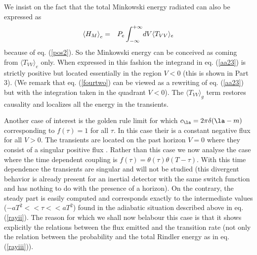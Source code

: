 \documentclass[12pt]{article}
\begin{document}
We insist on the fact that
the total Minkowski energy radiated can also be expressed as
\begin{eqnarray}
\mbox{$ \langle H_M \rangle $}_e &=& P_e \int^{+\infty}_{-\infty} \! dV\langle T_{VV} \rangle_e
\label{aa23}
\end{eqnarray}
because of eq. (\ref{pos2}).
So the Minkowski energy can be conceived as coming from
$\langle T_{VV} \rangle_e$ only. When expressed in this fashion the integrand
in eq. (\ref{aa23}) is strictly positive but located essentially in the region
$ V<0$ (this is shown in Part 3). (We remark that eq. (\ref{fourtwo}) can be
viewed as a rewriting of eq. (\ref{aa23}) but with the integration taken
in the quadrant $V<0$). The  $\langle T_{VV} \rangle_g$ term  restores
causality and localizes all the energy in the transients.

Another case of interest is the golden rule limit for which $c_\la = 2 \pi
\delta(\la-m)$ corresponding to $f(\tau) =1$ for all $\tau$. In this case
their is a constant negative flux for all $V>0$. The transients are located on
the past horizon $V=0$ where they consist of a singular positive flux
\cite{Unru2}. Rather
than this case
we
now analyse the case where the time dependent coupling is
$f(\tau) = \theta(\tau) \theta (T - \tau)$. With this time dependence the
transients are  singular and will not be studied
(this divergent behavior is already
present for an inertial detector with the same switch function and has
nothing to do with the presence of a horizon). On
the contrary, the steady part is easily computed and corresponds exactly to
the intermediate values ($- aT^2  << \tau << a T^2   $)
found in the adiabatic situation described
above in eq. (\ref{rayii}). The reason for which we shall now belabour this
case is that it shows
explicitly the  relations between the
flux emitted and the  transition rate (not only the relation
between the probability and the
total Rindler energy as in
eq. (\ref{rayiii})).
\end{document}
